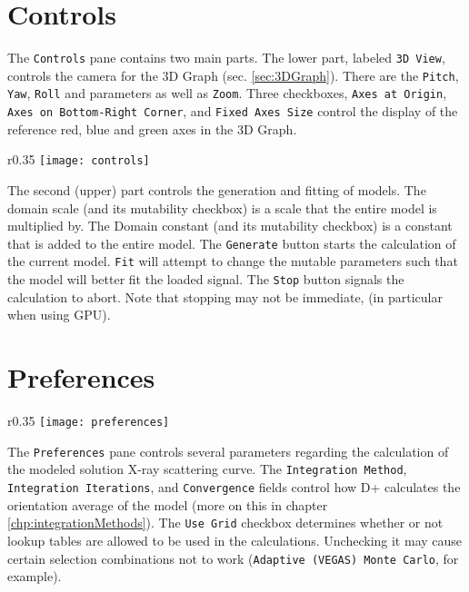 \documentclass[../D+Manual.tex]{subfiles}
\begin{document}
\section{Controls} 
\label{sec:controls}



The \texttt{Controls} pane contains two main parts. The lower part, labeled \texttt{3D View}, controls the camera for the 3D Graph (sec. \ref{sec:3DGraph}). There are the \texttt{Pitch}, \texttt{Yaw}, \texttt{Roll} and  parameters as well as \texttt{Zoom}. Three checkboxes, \texttt{Axes at Origin}, \texttt{Axes on Bottom-Right Corner}, and \texttt{Fixed Axes Size} control the display of the reference red, blue and green axes in the 3D Graph.

\begin{wrapfigure}{r}{0.35\textwidth}
	\vspace{-10pt}
	\centering
    \texttt{[image: controls]}
	\vspace{-10pt}
\end{wrapfigure}
The second (upper) part controls the generation and fitting of models. The domain scale (and its mutability checkbox) is a scale that the entire model is multiplied by. The Domain constant (and its mutability checkbox) is a constant that is added to the entire model. The \texttt{Generate} button starts the calculation of the current model. \texttt{Fit} will attempt to change the mutable parameters such that the model will better fit the loaded signal. The \texttt{Stop} button signals the calculation to abort. Note that stopping may not be immediate, (in particular when using GPU). 
\newpage
\section{Preferences} \label{sec:preferences}

\begin{wrapfigure}{r}{0.35\textwidth}
	\vspace{-10pt}
	\centering
    \texttt{[image: preferences]}
	\vspace{-10pt}
\end{wrapfigure}

The \texttt{Preferences} pane controls several parameters regarding the calculation of the modeled solution X-ray scattering curve. The \texttt{Integration Method}, \texttt{Integration Iterations}, and \texttt{Convergence} fields control how D+ calculates the orientation average of the model (more on this in chapter \ref{chp:integrationMethods}). The \texttt{Use Grid} checkbox determines whether or not lookup tables are allowed to be used in the calculations. Unchecking it may cause certain selection combinations not to work (\texttt{Adaptive (VEGAS) Monte Carlo}, for example). 
\end{document}
